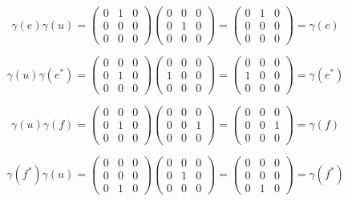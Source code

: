 \begin{solution}
    $$\gamma(e)\gamma(u)=\left(\begin{array}{ccc} 0 & 1 & 0 \\ 0 & 0 & 0 \\ 0 & 0 & 0 \end{array}\right)
    \left(\begin{array}{ccc} 0 & 0 & 0 \\ 0 & 1 & 0 \\ 0 & 0 & 0 \end{array}\right)
    =\left(\begin{array}{ccc} 0 & 1 & 0 \\ 0 & 0 & 0 \\ 0 & 0 & 0 \end{array}\right)=\gamma(e)$$

    $$\gamma(u)\gamma(e^*)=
    \left(\begin{array}{ccc} 0 & 0 & 0 \\ 0 & 1 & 0 \\ 0 & 0 & 0 \end{array}\right)
    \left(\begin{array}{ccc} 0 & 0 & 0 \\ 1 & 0 & 0 \\ 0 & 0 & 0 \end{array}\right)
    =\left(\begin{array}{ccc} 0 & 0 & 0 \\ 1 & 0 & 0 \\ 0 & 0 & 0 \end{array}\right)=\gamma(e^*)$$

    $$\gamma(u)\gamma(f)=\left(\begin{array}{ccc} 0 & 0 & 0 \\ 0 & 1 & 0 \\ 0 & 0 & 0 \end{array}\right)
    \left(\begin{array}{ccc} 0 & 0 & 0 \\ 0 & 0 & 1 \\ 0 & 0 & 0 \end{array}\right)
    =\left(\begin{array}{ccc} 0 & 0 & 0 \\ 0 & 0 & 1 \\ 0 & 0 & 0 \end{array}\right)=\gamma(f)$$

    $$\gamma(f^*)\gamma(u)=
    \left(\begin{array}{ccc} 0 & 0 & 0 \\ 0 & 0 & 0 \\ 0 & 1 & 0 \end{array}\right)
    \left(\begin{array}{ccc} 0 & 0 & 0 \\ 0 & 1 & 0 \\ 0 & 0 & 0 \end{array}\right)
    =\left(\begin{array}{ccc} 0 & 0 & 0 \\ 0 & 0 & 0 \\ 0 & 1 & 0 \end{array}\right)=\gamma(f^*)$$


\end{solution}

